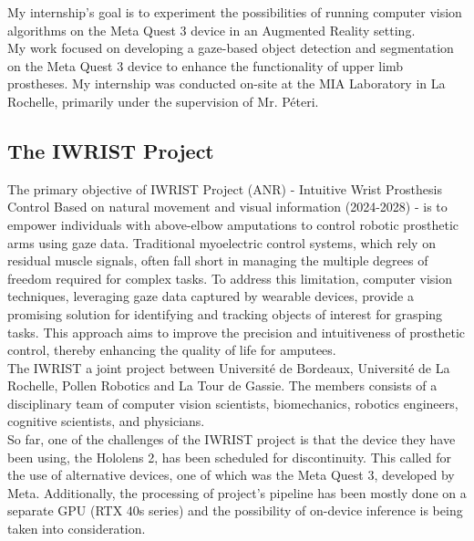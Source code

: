 \documentclass{article}
\begin{document}
My internship's goal is to experiment the possibilities of running computer vision algorithms on the Meta Quest 3 device in an Augmented Reality setting. \\


My work focused on developing a gaze-based object detection and segmentation on the Meta Quest 3 device to enhance the functionality of upper limb prostheses. My internship was conducted on-site at the MIA Laboratory in La Rochelle, primarily under the supervision of Mr. Péteri.


\subsection{The IWRIST Project}

The primary objective of IWRIST Project (ANR) - Intuitive Wrist Prosthesis Control Based on natural movement and visual information (2024-2028) - is to empower individuals with above-elbow amputations to control robotic prosthetic arms using gaze data. Traditional myoelectric control systems, which rely on residual muscle signals, often fall short in managing the multiple degrees of freedom required for complex tasks. To address this limitation, computer vision techniques, leveraging gaze data captured by wearable devices, provide a promising solution for identifying and tracking objects of interest for grasping tasks. This approach aims to improve the precision and intuitiveness of prosthetic control, thereby enhancing the quality of life for amputees.\\


The IWRIST a joint project between Université de Bordeaux, Université de La Rochelle, Pollen Robotics and La Tour de Gassie. The members consists of a disciplinary team of computer vision scientists, biomechanics, robotics engineers, cognitive scientists, and physicians. \\

So far, one of the challenges of the IWRIST project is that the device they have been using, the Hololens 2, has been scheduled for discontinuity. This called for the use of alternative devices, one of which was the Meta Quest 3, developed by Meta. Additionally, the processing of project's pipeline has been mostly done on a separate GPU (RTX 40s series) and the possibility of on-device inference is being taken into consideration.\\
\end{document}
